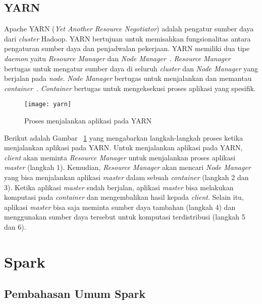 \subsection{YARN}

Apache YARN (\textit{Yet Another Resource Negotiator}) adalah pengatur sumber daya dari \textit{cluster} Hadoop. YARN bertujuan untuk memisahkan fungsionalitas antara pengaturan sumber daya dan penjadwalan pekerjaan. YARN memiliki dua tipe \textit{daemon} yaitu \textit{Resource Manager} dan \textit{Node Manager}~\cite{tomwhite:05:htdg}.  \textit{Resource Manager} bertugas untuk mengatur sumber daya di seluruh \textit{cluster} dan \textit{Node Manager} yang berjalan pada \textit{node}. \textit{Node Manager} bertugas untuk menjalankan dan memantau \textit{container}~\cite{tomwhite:05:htdg}. \textit{Container} bertugas untuk mengeksekusi proses aplikasi yang spesifik.

\begin{figure}[H]
    \centering  
    \texttt{[image: yarn]}  
    \caption[Proses menjalankan aplikasi pada YARN]{Proses menjalankan aplikasi pada YARN} 
    \label{fig:yarn} 
\end{figure}

Berikut adalah Gambar ~\ref{fig:yarn} yang mengabarkan langkah-langkah proses ketika menjalankan aplikasi pada YARN. Untuk menjalankan aplikasi pada YARN, \textit{client} akan meminta \textit{Resource Manager} untuk menjalankan proses aplikasi \textit{master} (langkah 1). Kemudian, \textit{Resource Manager} akan mencari \textit{Node Manager} yang bisa menjalankan aplikasi \textit{master} dalam sebuah \textit{container} (langkah 2 dan 3). Ketika aplikasi \textit{master} sudah berjalan, aplikasi \textit{master} bisa melakukan komputasi pada \textit{container} dan mengembalikan hasil kepada \textit{client}. Selain itu, aplikasi \textit{master} bisa saja meminta sumber daya tambahan (langkah 4) dan menggunakan sumber daya tersebut untuk komputasi terdistribusi (langkah 5 dan 6).\\

\section{Spark}

\subsection{Pembahasan Umum Spark}

